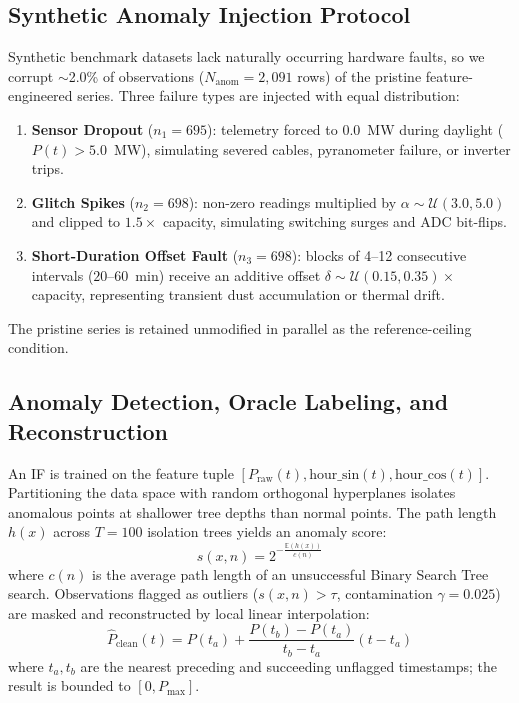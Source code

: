 \documentclass[conference]{IEEEtran}
\begin{document}
\subsection{Synthetic Anomaly Injection Protocol}
Synthetic benchmark datasets lack naturally occurring hardware faults, so we corrupt $\sim$2.0\% of observations ($N_{\text{anom}} = 2{,}091$ rows) of the pristine feature-engineered series. Three failure types are injected with equal distribution:
\begin{enumerate}
    \item \textbf{Sensor Dropout} ($n_1 = 695$): telemetry forced to $0.0$~MW during daylight ($P(t) > 5.0$~MW), simulating severed cables, pyranometer failure, or inverter trips.
    \item \textbf{Glitch Spikes} ($n_2 = 698$): non-zero readings multiplied by $\alpha \sim \mathcal{U}(3.0, 5.0)$ and clipped to $1.5 \times$ capacity, simulating switching surges and ADC bit-flips.
    \item \textbf{Short-Duration Offset Fault} ($n_3 = 698$): blocks of 4--12 consecutive intervals ($20$--$60$~min) receive an additive offset $\delta \sim \mathcal{U}(0.15, 0.35) \times$ capacity, representing transient dust accumulation or thermal drift.
\end{enumerate}
The pristine series is retained unmodified in parallel as the reference-ceiling condition.

\subsection{Anomaly Detection, Oracle Labeling, and Reconstruction}
An IF is trained on the feature tuple $[P_{\text{raw}}(t), \text{hour\_sin}(t), \text{hour\_cos}(t)]$. Partitioning the data space with random orthogonal hyperplanes isolates anomalous points at shallower tree depths than normal points. The path length $h(x)$ across $T=100$ isolation trees yields an anomaly score:
\begin{equation}
s(x, n) = 2^{-\frac{\mathbb{E}(h(x))}{c(n)}}
\end{equation}
where $c(n)$ is the average path length of an unsuccessful Binary Search Tree search. Observations flagged as outliers ($s(x,n) > \tau$, contamination $\gamma = 0.025$) are masked and reconstructed by local linear interpolation:
\begin{equation}
\hat{P}_{\text{clean}}(t) = P(t_a) + \frac{P(t_b) - P(t_a)}{t_b - t_a}(t - t_a)
\end{equation}
where $t_a, t_b$ are the nearest preceding and succeeding unflagged timestamps; the result is bounded to $[0, P_{\text{max}}]$.
\end{document}
